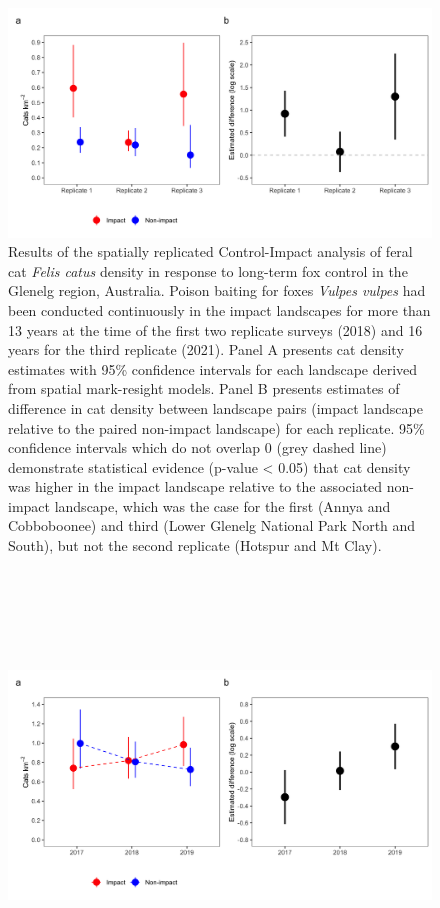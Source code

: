 \documentclass[11pt,a4paper,titlepage,twoside,openright]{style/unimelbthesis}
\begin{document}
\begin{mainmatter}
\(~\)

\(~\)

\(~\)
\begin{figure}

{\centering \includegraphics[width=1\linewidth]{figure/glenelg_estimates_600dpi} 

}

\caption{Results of the spatially replicated Control-Impact analysis of feral cat \textit{Felis catus} density in response to long-term fox control in the Glenelg region, Australia. Poison baiting for foxes \textit{Vulpes vulpes} had been conducted continuously in the impact landscapes for more than 13 years at the time of the first two replicate surveys (2018) and 16 years for the third replicate (2021). Panel A presents cat density estimates with 95\% confidence intervals for each landscape derived from spatial mark-resight models. Panel B presents estimates of difference in cat density between landscape pairs (impact landscape relative to the paired non-impact landscape) for each replicate. 95\% confidence intervals which do not overlap 0 (grey dashed line) demonstrate statistical evidence (p-value < 0.05) that cat density was higher in the impact landscape relative to the associated non-impact landscape, which was the case for the first (Annya and Cobboboonee) and third (Lower Glenelg National Park North and South), but not the second replicate (Hotspur and Mt Clay).}\label{fig:diffg}
\end{figure}
\newpage

\(~\)

\(~\)

\(~\)
\begin{figure}

{\centering \includegraphics[width=1\linewidth]{figure/otways_estimates_600dpi} 

}
\end{figure}
\end{mainmatter}
\end{document}
